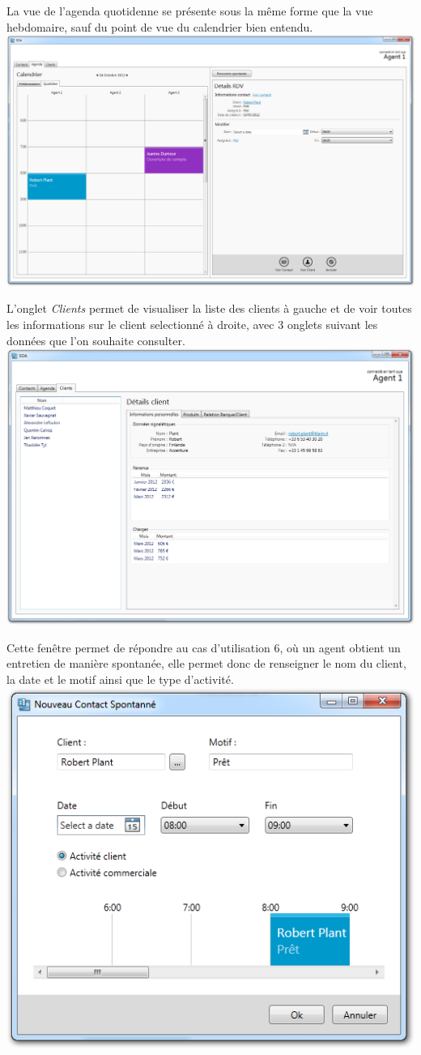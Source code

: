 La vue de l'agenda quotidenne se présente sous la même forme que la vue hebdomaire, sauf du point de vue du calendrier bien entendu.
\includegraphics[width=\textwidth]{../../ihm/pngIHM/CalendrierQuotidien.png}

L'onglet \textit{Clients} permet de visualiser la liste des clients à gauche et de voir toutes les informations sur le client selectionné à droite, avec 3 onglets suivant les données que l'on souhaite consulter.
\includegraphics[width=\textwidth]{../../ihm/pngIHM/ListeClients.png}

Cette fenêtre permet de répondre au cas d'utilisation 6, où un agent obtient un entretien de manière spontanée, elle permet donc de renseigner le nom du client, la date et le motif ainsi que le type d'activité.
\includegraphics[width=\textwidth]{../../ihm/pngIHM/NouveauContactSpontanne.png}


